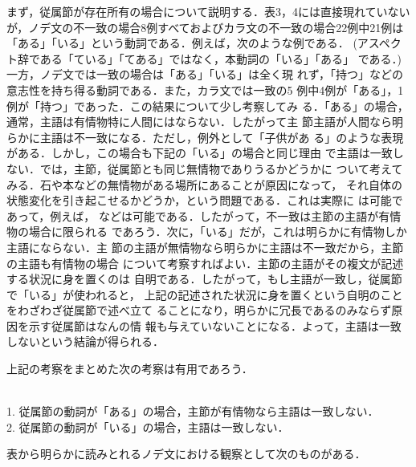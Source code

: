 まず，従属節が存在所有の場合について説明する．表3，4には直接現れていない
が，ノデ文の不一致の場合8例すべておよびカラ文の不一致の場合22例中21例は
「ある」「いる」という動詞である．例えば，次のような例である．
(アスペクト辞である「ている」「てある」ではなく，本動詞の「いる」「ある」
である．)一方，ノデ文では一致の場合は「ある」「いる」は全く現
れず，「持つ」などの意志性を持ち得る動詞である．また，カラ文では一致の5
例中4例が「ある」，1例が「持つ」であった．この結果について少し考察してみ
る．「ある」の場合，通常，主語は有情物特に人間にはならない．したがって主
節主語が人間なら明らかに主語は不一致になる．ただし，例外として「子供があ
る」のような表現がある．しかし，この場合も下記の「いる」の場合と同じ理由
で主語は一致しない．では，主節，従属節とも同じ無情物でありうるかどうかに
ついて考えてみる．石や本などの無情物がある場所にあることが原因になって，
それ自体の状態変化を引き起こせるかどうか，という問題である．これは実際に
は可能であって，例えば，
などは可能である．したがって，不一致は主節の主語が有情物の場合に限られる
であろう．次に，「いる」だが，これは明らかに有情物しか主語にならない．主
節の主語が無情物なら明らかに主語は不一致だから，主節の主語も有情物の場合
について考察すればよい．主節の主語がその複文が記述する状況に身を置くのは
自明である．したがって，もし主語が一致し，従属節で「いる」が使われると，
上記の記述された状況に身を置くという自明のことをわざわざ従属節で述べ立て
ることになり，明らかに冗長であるのみならず原因を示す従属節はなんの情
報も与えていないことになる．よって，主語は一致しないという結論が得られる．

上記の考察をまとめた次の考察は有用であろう．

\begin{kousatu}\label{110}~\\
1. 従属節の動詞が「ある」の場合，主節が有情物なら主語は一致しない．\\
2. 従属節の動詞が「いる」の場合，主語は一致しない．
\end{kousatu}

表から明らかに読みとれるノデ文における観察として次のものがある．

